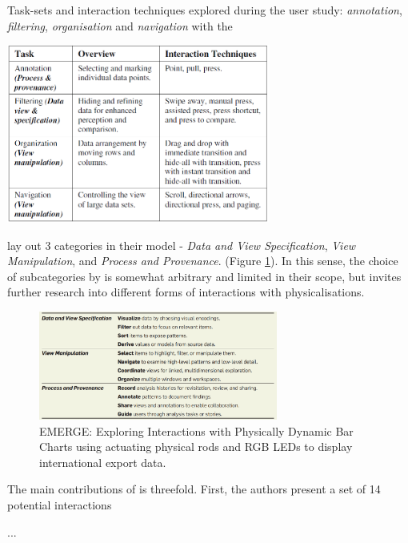 \documentclass[11pt]{article}
\begin{document}
\begin{table}[H]
\centering
\caption{Task-sets and interaction techniques explored during the user study: \textit{annotation}, \textit{filtering}, \textit{organisation} and \textit{navigation} with the }\label{tbl:taher2015-user-study}
\includegraphics[width=0.65\textwidth]{img/taher2015-user-study.png} 
\end{table}

\citeauthor{heer2012} lay out 3 categories in their model - \textit{Data and View Specification},
\textit{View Manipulation}, and \textit{Process and Provenance}. (Figure \ref{fig:heer2012-taxonomy}). In this sense, the choice of subcategories by \citeauthor{taher2015} is somewhat arbitrary and limited in their scope, but invites further research into different forms of interactions with physicalisations.

\begin{figure}[H]
\centering
\includegraphics[width=0.7\textwidth]{img/heer2012-taxonomy.png} 
\caption{EMERGE: Exploring Interactions with Physically Dynamic Bar Charts using actuating physical rods and RGB LEDs to display international export data.}\label{fig:heer2012-taxonomy}
\end{figure}

The main contributions of \citet{taher2015} is threefold. First, the authors present a set of 14 potential interactions 


...
\end{document}

